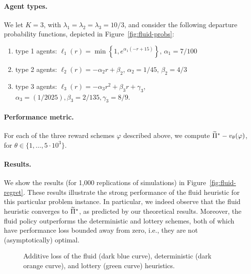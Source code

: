 \documentclass[12pt]{article}
\begin{document}
\paragraph{Agent types.} We let $K = 3$, with $\lambda_1 = \lambda_2 = \lambda_3 = 10/3$, and consider the following departure probability functions, depicted in Figure~\ref{fig:fluid-probs}:
\begin{enumerate}
    \item type 1 agents: $\ell_1(r) = \min\left\{1,e^{\alpha_1(-r+15)}\right\}$, $\alpha_1 = 7/100$
    \item type 2 agents: $\ell_2(r) = -\alpha_2r + \beta_2$, $\alpha_2 = 1/45$, $\beta_2 = 4/3$
    \item type 3 agents: $\ell_3(r) = -\alpha_3r^2 + \beta_3r + \gamma_3$, $\alpha_3 = (1/2025), \beta_3 = 2/135, \gamma_3=8/9$.
\end{enumerate}



\paragraph{Performance metric.} 
For each of the three reward schemes $\varphi$ described above, we compute
$\widetilde{\Pi}^* - v_{\theta}(\varphi)$, for $\theta\in\{1,\ldots,5\cdot 10^3\}.$

\paragraph{Results.} We show the results {(for 1,000 replications of simulations)} in Figure~\ref{fig:fluid-regret}. These results illustrate the strong performance of the fluid heuristic for this particular problem instance. In particular, we indeed observe that the fluid heuristic converges to $\widetilde{\Pi}^*$, %
as predicted by our theoretical results. Moreover, the fluid policy %
outperforms the deterministic and lottery schemes, {both of which have performance loss bounded away from zero, i.e., they are not (asymptotically) optimal.} 


\begin{figure}%
	\captionsetup[subfigure]{justification=centering}
	\centering
	\quad%
	\caption{\centering Additive loss of the fluid (dark blue curve), deterministic (dark orange curve), and lottery (green curve) heuristics.}%
	\label{fig:ogd-regret}%
\end{figure}
\end{document}
